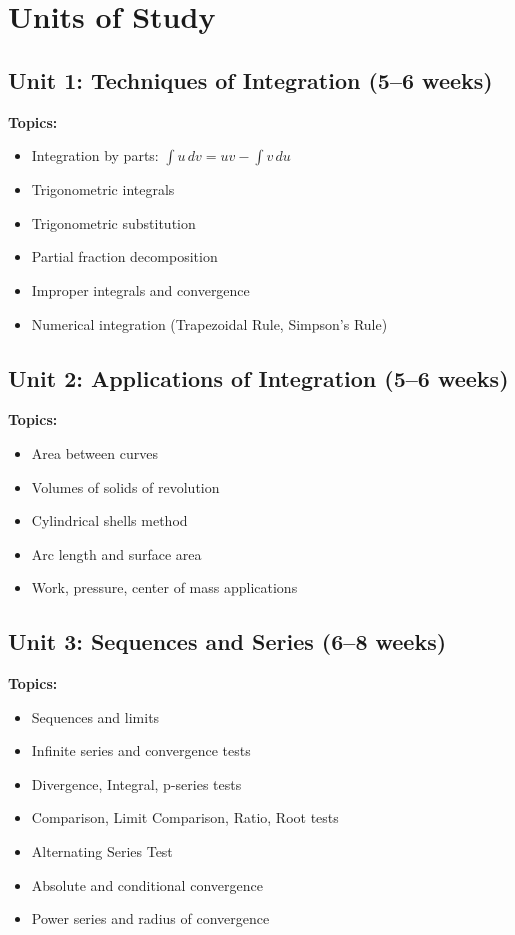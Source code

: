 \documentclass[12pt,oneside]{book}
\begin{document}
\section{Units of Study}

\subsection{Unit 1: Techniques of Integration (5--6 weeks)}

\textbf{Topics:}
\begin{itemize}
    \item Integration by parts: $\int u \, dv = uv - \int v \, du$
    \item Trigonometric integrals
    \item Trigonometric substitution
    \item Partial fraction decomposition
    \item Improper integrals and convergence
    \item Numerical integration (Trapezoidal Rule, Simpson's Rule)
\end{itemize}

\subsection{Unit 2: Applications of Integration (5--6 weeks)}

\textbf{Topics:}
\begin{itemize}
    \item Area between curves
    \item Volumes of solids of revolution
    \item Cylindrical shells method
    \item Arc length and surface area
    \item Work, pressure, center of mass applications
\end{itemize}

\subsection{Unit 3: Sequences and Series (6--8 weeks)}

\textbf{Topics:}
\begin{itemize}
    \item Sequences and limits
    \item Infinite series and convergence tests
    \item Divergence, Integral, p-series tests
    \item Comparison, Limit Comparison, Ratio, Root tests
    \item Alternating Series Test
    \item Absolute and conditional convergence
    \item Power series and radius of convergence
\end{itemize}
\end{document}
